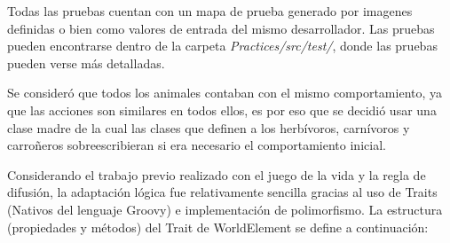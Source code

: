     Todas las pruebas cuentan con un mapa de prueba generado por imagenes definidas o bien como valores de entrada del mismo desarrollador. Las pruebas pueden encontrarse dentro de la carpeta \textit{Practices/src/test/}, donde las pruebas pueden verse más detalladas.

    Se consideró que todos los animales contaban con el mismo comportamiento, ya que las acciones son similares en todos ellos, es por eso que se decidió usar una clase madre de la cual las clases que definen a los herbívoros, carnívoros y carroñeros sobreescribieran si era necesario el comportamiento inicial.

    Considerando el trabajo previo realizado con el juego de la vida y la regla de difusión, la adaptación lógica fue relativamente sencilla gracias al uso de Traits (Nativos del lenguaje Groovy) e implementación de polimorfismo. La estructura (propiedades y métodos) del Trait de WorldElement  se define a continuación:

